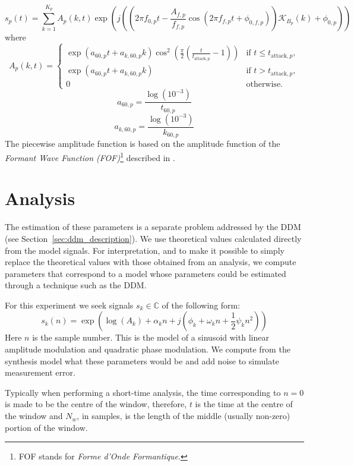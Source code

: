 \[
    s_{p}(t) = \sum_{k=1}^{K_{p}} A_{p}(k,t) \exp(j((2\pi
    f_{0,p}t - \frac{A_{f,p}}{f_{f,p}} \cos(2\pi f_{f,p} t +
    \phi_{0,f,p})) \mathcal{K}_{B_{p}}(k) + \phi_{0,p}))
\]
where
\[
    A_{p}(k,t) = 
    \begin{cases}
        \exp(a_{60,p} t + a_{k,60,p}k) \cos^{2}
        (\frac{\pi}{2}(\frac{t}{t_{\text{attack},p}} - 1)) & \text{if } t \leq
        t_{\text{attack},p},\\
        \exp(a_{60,p} t + a_{k,60,p}k) & \text{if } t > t_{\text{attack},p},\\
        0 & \text{otherwise}.
    \end{cases}
\]
\[
    a_{60,p} = \frac{\log(10^{-3})}{t_{60,p}}
\]
\[
    a_{k,60,p} = \frac{\log(10^{-3})}{k_{60,p}} 
\]
The piecewise amplitude function is based on the amplitude function of the
\textit{Formant Wave Function (FOF)}\footnote{FOF stands for \textit{Forme
d'Onde Formantique}.} described in \cite[p.~19]{rodet1984chant}.

\section{Analysis}

The estimation of these parameters is a separate problem addressed by the
DDM (see Section~\ref{sec:ddm_description}). We use theoretical values calculated
directly from the model signals. For interpretation, and to make it possible to
simply replace the theoretical values with those obtained from an analysis, we
compute parameters that correspond to a model whose parameters could be
estimated through a technique such as the DDM.

For this experiment we seek signals $s_k \in \mathbb{C}$ of the following form:
\begin{equation}
    s_{k}(n) = \exp(\log(A_{k}) + \alpha_{k}n + j(\phi_{k} + \omega_{k}n +
    \frac{1}{2} \psi_{k} n^{2}))
    \label{eq:rm_model}
\end{equation}
Here $n$ is the sample number. This is the model of a sinusoid with linear
amplitude modulation and quadratic phase modulation. We compute from the
synthesis model what these parameters would be and add noise to simulate
measurement error.

Typically when performing a short-time analysis,
the time corresponding to $n = 0$ is made to be the centre of the window,
therefore, $t$ is the time at the centre of the window and $N_{w}$, in samples,
is the length of the middle (usually non-zero) portion of the window.

